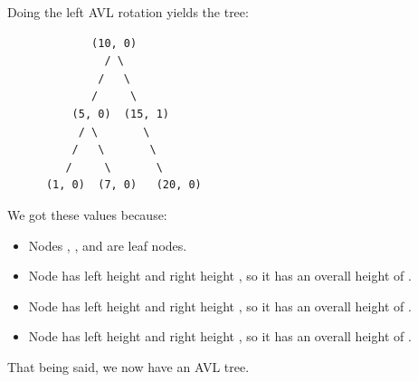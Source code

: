 \documentclass[letterpaper]{article}
\begin{document}
\begin{enumerate}[(1)]
    \bigskip

    Doing the left AVL rotation yields the tree: 
    \begin{verbatim}
             (10, 0)
               / \ 
              /   \ 
             /     \ 
          (5, 0)  (15, 1)
           / \       \ 
          /   \       \ 
         /     \       \ 
      (1, 0)  (7, 0)   (20, 0)
    \end{verbatim}
    We got these values because: 
    \begin{itemize}
        \item Nodes , , and  are leaf nodes. 
        \item Node  has left height  and right height , so it has an overall height of . 
        \item Node \code{15} has left height  and right height , so it has an overall height of . 
        \item Node  has left height  and right height , so it has an overall height of . 
    \end{itemize}
    That being said, we now have an AVL tree. 
\end{enumerate}
\end{document}
